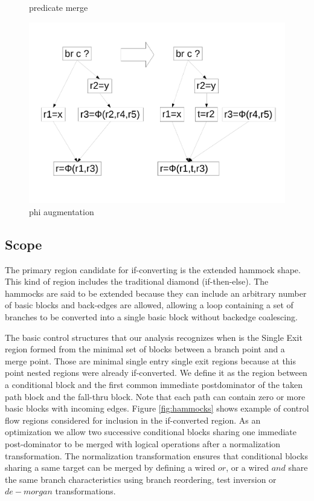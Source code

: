 \begin{figure}
\begin{minipage}[t]{6cm}
\caption{predicate merge}
\end{minipage}
\begin{minipage}[t]{5cm}
\includegraphics[scale=0.2]{phi_augmentation.pdf}
\caption{phi augmentation}
\label{fig:phi_aug}
\end{minipage}
\label{fig: phi_operations}
\end{figure}

\subsection{Scope}

The primary region candidate for if-converting is the extended hammock shape. This kind of region includes the traditional diamond (if-then-else). The hammocks are said to be extended because they can include an arbitrary number of basic blocks and back-edges are allowed, allowing a loop containing a set of branches to be converted into a single basic block without backedge coalescing.

The basic control structures that our analysis recognizes when is the Single Exit region formed from the minimal set of blocks between a branch point and a merge point.  Those are minimal single entry single exit regions because at this point nested regions were already if-converted. We define it as the region between a conditional block and the first common immediate postdominator of the taken path block and the fall-thru block.
Note that each path can contain zero or more basic blocks with incoming edges. Figure \ref{fig:hammocks} shows example of control flow regions considered for inclusion in the if-converted region.
As an optimization we allow two successive conditional blocks sharing one immediate post-dominator to be merged with logical operations after a normalization transformation. The normalization transformation ensures that conditional blocks sharing a same target can be merged by defining a wired $or$, or a wired $and$ share the same branch characteristics using branch reordering, test inversion or $de-morgan$ transformations.

